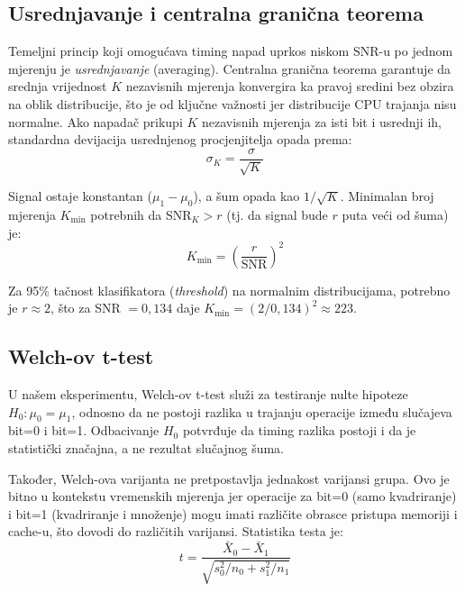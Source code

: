 \subsection{Usrednjavanje i centralna granična teorema}

Temeljni princip koji omogućava timing napad uprkos niskom SNR-u po jednom mjerenju je \textit{usrednjavanje} (averaging). Centralna granična teorema garantuje da srednja vrijednost $K$ nezavisnih mjerenja konvergira ka pravoj sredini bez obzira na oblik distribucije, što je od ključne važnosti jer distribucije CPU trajanja nisu normalne. Ako napadač prikupi $K$ nezavisnih mjerenja za isti bit i usrednji ih, standardna devijacija usrednjenog procjenjitelja opada prema:
\begin{equation}
\sigma_K = \frac{\sigma}{\sqrt{K}}
\label{eq:averaging}
\end{equation}

Signal ostaje konstantan ($\mu_1 - \mu_0$), a šum opada kao $1/\sqrt{K}$. Minimalan broj mjerenja $K_{\min}$ potrebnih da SNR$_K > r$ (tj. da signal bude $r$ puta veći od šuma) je:
\begin{equation}
K_{\min} = \left(\frac{r}{\text{SNR}}\right)^2
\label{eq:kmin}
\end{equation}

\noindent Za 95\% tačnost klasifikatora (\textit{threshold}) na normalnim distribucijama, potrebno je $r \approx 2$, što za SNR $= 0{,}134$ daje $K_{\min} = (2 / 0{,}134)^2 \approx 223$.

\subsection{Welch-ov t-test}

U našem eksperimentu, Welch-ov t-test \cite{welch1947} služi za testiranje nulte hipoteze $H_0: \mu_0 = \mu_1$, odnosno da ne postoji razlika u trajanju operacije između slučajeva bit=0 i bit=1. Odbacivanje $H_0$ potvrđuje da timing razlika postoji i da je statistički značajna, a ne rezultat slučajnog šuma.

Također, Welch-ova varijanta ne pretpostavlja jednakost varijansi grupa. Ovo je bitno u kontekstu vremenskih mjerenja jer operacije za bit=0 (samo kvadriranje) i bit=1 (kvadriranje i množenje) mogu imati različite obrasce pristupa memoriji i cache-u, što dovodi do različitih varijansi. Statistika testa je:
\begin{equation}
t = \frac{\bar{X}_0 - \bar{X}_1}{\sqrt{s_0^2/n_0 + s_1^2/n_1}}
\label{eq:ttest}
\end{equation}

